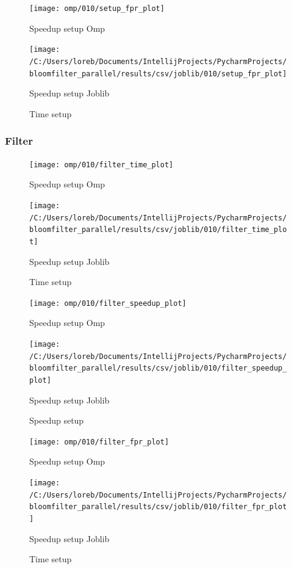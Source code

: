\documentclass[11pt]{article}
\begin{document}
    \begin{figure}[H]
        \centering
        \texttt{[image: omp/010/setup\_fpr\_plot]}
            \caption{Speedup setup Omp}\label{fig:010-setup_fpr_omp}
        \endminipage\hfill
        \texttt{[image: /C:/Users/loreb/Documents/IntellijProjects/PycharmProjects/bloomfilter\_parallel/results/csv/joblib/010/setup\_fpr\_plot]}
            \caption{Speedup setup Joblib}\label{fig:010-setup_fpr_joblib}
        \endminipage\hfill
        \caption{Time setup}
    \end{figure}
    \subsubsection{Filter}\label{subsubsec:fpr-010-filter}
    \begin{figure}[H]
        \centering
        \texttt{[image: omp/010/filter\_time\_plot]}
            \caption{Speedup setup Omp}\label{fig:010-filter_time_omp}
        \endminipage\hfill
        \texttt{[image: /C:/Users/loreb/Documents/IntellijProjects/PycharmProjects/bloomfilter\_parallel/results/csv/joblib/010/filter\_time\_plot]}
            \caption{Speedup setup Joblib}\label{fig:010-filter_time_joblib}
        \endminipage\hfill
        \caption{Time setup}
    \end{figure}
    \begin{figure}[H]
        \centering
        \texttt{[image: omp/010/filter\_speedup\_plot]}
            \caption{Speedup setup Omp}\label{fig:010-filter_speedup_omp}
        \endminipage\hfill
        \texttt{[image: /C:/Users/loreb/Documents/IntellijProjects/PycharmProjects/bloomfilter\_parallel/results/csv/joblib/010/filter\_speedup\_plot]}
            \caption{Speedup setup Joblib}\label{fig:010-filter_speedup_joblib}
        \endminipage\hfill
        \caption{Speedup setup}
    \end{figure}
    \begin{figure}[H]
        \centering
        \texttt{[image: omp/010/filter\_fpr\_plot]}
            \caption{Speedup setup Omp}\label{fig:010-filter_fpr_omp}
        \endminipage\hfill
        \texttt{[image: /C:/Users/loreb/Documents/IntellijProjects/PycharmProjects/bloomfilter\_parallel/results/csv/joblib/010/filter\_fpr\_plot]}
            \caption{Speedup setup Joblib}\label{fig:010-filter_fpr_joblib}
        \endminipage\hfill
        \caption{Time setup}
    \end{figure}
\end{document}

